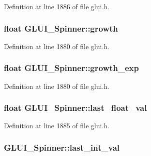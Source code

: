 Definition at line 1886 of file glui.\+h.

\hypertarget{class_g_l_u_i___spinner_af6d70e43fe004a785ae88caebff1dafc}{
\subsubsection[{growth}]{\setlength{\rightskip}{0pt plus 5cm}float G\+L\+U\+I\+\_\+\+Spinner\+::growth}}\label{class_g_l_u_i___spinner_af6d70e43fe004a785ae88caebff1dafc}


Definition at line 1880 of file glui.\+h.

\hypertarget{class_g_l_u_i___spinner_a66d20426f12953bcf8c8746f683a5d59}{
\subsubsection[{growth\+\_\+exp}]{\setlength{\rightskip}{0pt plus 5cm}float G\+L\+U\+I\+\_\+\+Spinner\+::growth\+\_\+exp}}\label{class_g_l_u_i___spinner_a66d20426f12953bcf8c8746f683a5d59}


Definition at line 1880 of file glui.\+h.

\hypertarget{class_g_l_u_i___spinner_a66e88882e8deec8ffb68db1c5450b651}{
\subsubsection[{last\+\_\+float\+\_\+val}]{\setlength{\rightskip}{0pt plus 5cm}float G\+L\+U\+I\+\_\+\+Spinner\+::last\+\_\+float\+\_\+val}}\label{class_g_l_u_i___spinner_a66e88882e8deec8ffb68db1c5450b651}


Definition at line 1885 of file glui.\+h.

\hypertarget{class_g_l_u_i___spinner_a46ce023ca0af2c4fc9b06084b7899aba}{
\subsubsection[{last\+\_\+int\+\_\+val}]{ G\+L\+U\+I\+\_\+\+Spinner\+::last\+\_\+int\+\_\+val}}\label{class_g_l_u_i___spinner_a46ce023ca0af2c4fc9b06084b7899aba}


